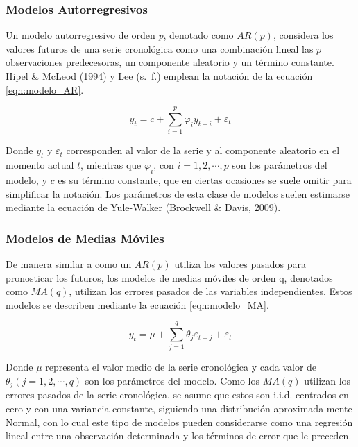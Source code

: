 \documentclass[
]{article}
\begin{document}
\subsubsection{Modelos Autorregresivos}

Un modelo autorregresivo de orden \emph{p}, denotado como \(AR(p)\),
considera los valores futuros de una serie cronológica como una
combinación lineal las \(p\) observaciones predecesoras, un componente
aleatorio y un término constante. Hipel \& McLeod
(\protect\hyperlink{ref-Hipel}{1994}) y Lee
(\protect\hyperlink{ref-Lee}{s.~f.}) emplean la notación de la ecuación
\ref{eqn:modelo_AR}.

\begin{equation}
\label{eqn:modelo_AR}
y_t=c+\sum_{i=1}^p \varphi_iy_{t-i}+\varepsilon_t
\end{equation}

Donde \(y_t\) y \(\varepsilon_t\) corresponden al valor de la serie y al
componente aleatorio en el momento actual \(t\), mientras que
\(\varphi_i\), con \(i=1,2,\cdots,p\) son los parámetros del modelo, y
\(c\) es su término constante, que en ciertas ocasiones se suele omitir
para simplificar la notación. Los parámetros de esta clase de modelos
suelen estimarse mediante la ecuación de Yule-Walker (Brockwell \&
Davis, \protect\hyperlink{ref-yule.walker}{2009}).

\subsubsection{Modelos de Medias Móviles}

De manera similar a como un \(AR(p)\) utiliza los valores pasados para
pronosticar los futuros, los modelos de medias móviles de orden q,
denotados como \(MA(q)\), utilizan los errores pasados de las variables
independientes. Estos modelos se describen mediante la ecuación
\ref{eqn:modelo_MA}.

\begin{equation}
\label{eqn:modelo_MA}
y_t=\mu+\sum_{j=1}^q \theta_j \varepsilon_{t-j}+\varepsilon_t
\end{equation}

Donde \(\mu\) representa el valor medio de la serie cronológica y cada
valor de \(\theta_j(j=1,2,\cdots,q)\) son los parámetros del modelo.
Como los \(MA(q)\) utilizan los errores pasados de la serie cronológica,
se asume que estos son i.i.d. centrados en cero y con una variancia
constante, siguiendo una distribución aproximada mente Normal, con lo
cual este tipo de modelos pueden considerarse como una regresión lineal
entre una observación determinada y los términos de error que le
preceden.
\end{document}
